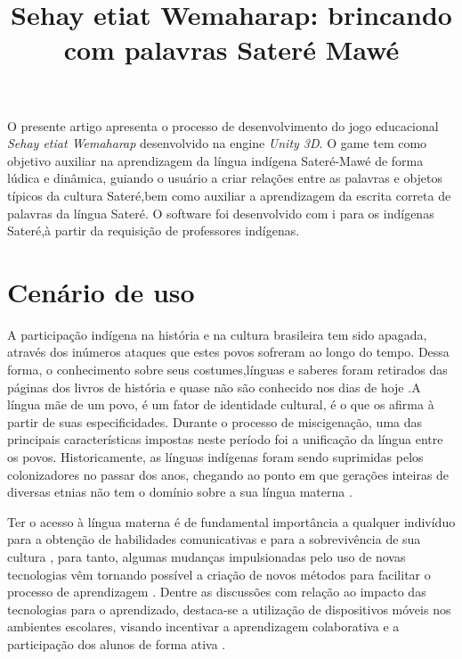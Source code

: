 \documentclass[12pt]{article}
\title{Sehay etiat Wemaharap: brincando com palavras Sateré Mawé}
\begin{document}
 

	
	\begin{resumo} 
		O presente artigo apresenta o processo de desenvolvimento do jogo educacional  \textit{Sehay etiat Wemaharap} desenvolvido na engine \textit{Unity 3D}. O game tem como objetivo auxiliar na aprendizagem da língua indígena Sateré-Mawé de forma lúdica e dinâmica, guiando o usuário a criar relações entre as palavras e objetos típicos da cultura Sateré,bem como auxiliar a aprendizagem da escrita correta de palavras da língua Sateré. O software foi desenvolvido com i para os indígenas Sateré,à partir da requisição de professores indígenas.
	\end{resumo}
	
	\section{Cenário de uso}
		A participação indígena na história e na cultura brasileira tem sido apagada, através dos inúmeros ataques que estes povos sofreram ao longo do tempo. Dessa forma, o conhecimento sobre seus costumes,línguas e saberes foram retirados das páginas dos livros de história e quase não são conhecido nos dias de hoje \cite{seki2000linguas}.A língua mãe de um povo, é um fator de identidade cultural, é o que os afirma à partir de suas especificidades. Durante o processo de miscigenação, uma das principais características impostas neste período foi a unificação da língua entre os povos. Historicamente, as línguas indígenas foram sendo suprimidas pelos colonizadores no passar dos anos, chegando ao ponto em que gerações inteiras de diversas etnias não tem o domínio sobre a sua língua materna \cite{cunha2008politicas}.
		
		Ter o acesso à língua materna é de fundamental importância a qualquer indivíduo para a obtenção de habilidades comunicativas e para a sobrevivência de sua cultura \cite{de2018livro}, para tanto, algumas mudanças impulsionadas pelo uso de novas tecnologias vêm tornando possível a criação de novos métodos para facilitar o processo de aprendizagem \cite{yamato2017amargana}. Dentre as discussões com relação ao impacto das tecnologias para o aprendizado, destaca-se a utilização de dispositivos móveis nos ambientes escolares, visando incentivar a aprendizagem colaborativa e a participação dos alunos de forma ativa \cite{rossing2012ilearning}.
		
\end{document}
